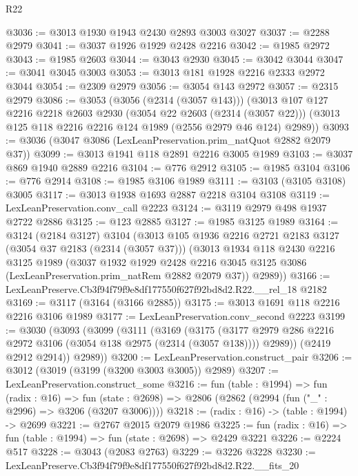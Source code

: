 \begin{lexlean}{R22}
\begin{coremodule}
@3036 := @3013 @1930 @1943 @2430 @2893 @3003 @3027
@3037 := @2288 @2979
@3041 := @3037 @1926 @1929 @2428 @2216
@3042 := @1985 @2972
@3043 := @1985 @2603
@3044 := @3043 @2930
@3045 := @3042 @3044
@3047 := @3041 @3045 @3003
@3053 := @3013 @181 @1928 @2216 @2333 @2972 @3044
@3054 := @2309 @2979
@3056 := @3054 @143 @2972
@3057 := @2315 @2979
@3086 := @3053
    (@3056 (@2314 (@3057 @143)))
    (@3013
      @107
      @127
      @2216
      @2218
      @2603
      @2930
      (@3054 @22 @2603 (@2314 (@3057 @22)))
      (@3013 @125 @118 @2216 @2216 @124 @1989 (@2556 @2979 @46 @124) @2989))
@3093 := @3036 (@3047 @3086 (LexLeanPreservation.prim_natQuot @2882 @2079 @37))
@3099 := @3013 @1941 @118 @2891 @2216 @3005 @1989
@3103 := @3037 @869 @1940 @2889 @2216
@3104 := @776 @2912
@3105 := @1985 @3104
@3106 := @776 @2914
@3108 := @1985 @3106 @1989
@3111 := @3103 (@3105 @3108) @3005
@3117 := @3013 @1938 @1693 @2887 @2218 @3104 @3108
@3119 := LexLeanPreservation.conv_call @2223
@3124 := @3119 @2979 @498 @1937 @2722 @2886
@3125 := @123 @2885
@3127 := @1985 @3125 @1989
@3164 := @3124
    (@2184 @3127)
    @3104
    (@3013
      @105
      @1936
      @2216
      @2721
      @2183
      @3127
      (@3054 @37 @2183 (@2314 (@3057 @37)))
      (@3013
        @1934
        @118
        @2430
        @2216
        @3125
        @1989
        (@3037
          @1932
          @1929
          @2428
          @2216
          @3045
          @3125
          @3086
          (LexLeanPreservation.prim_natRem @2882 @2079 @37))
        @2989))
@3166 := LexLeanPreserve.Cb3f94f79f9e8df177550f627f92bd8d2.R22.__rel_18 @2182
@3169 := @3117 (@3164 (@3166 @2885))
@3175 := @3013 @1691 @118 @2216 @2216 @3106 @1989
@3177 := LexLeanPreservation.conv_second @2223
@3199 := @3030
    (@3093
      (@3099
        (@3111
          (@3169
            (@3175
              (@3177 @2979 @286 @2216 @2972 @3106 (@3054 @138 @2975 (@2314 (@3057 @138))))
              @2989))
          (@2419 @2912 @2914))
        @2989))
@3200 := LexLeanPreservation.construct_pair
@3206 := @3012 (@3019 (@3199 (@3200 @3003 @3005)) @2989)
@3207 := LexLeanPreservation.construct_some
@3216 := fun (table : @1994) =>
  fun (radix : @16) =>
  fun (state : @2698) => @2806 (@2862 (@2994 (fun ("_" : @2996) => @3206 (@3207 @3006))))
@3218 := (radix : @16) -> (table : @1994) -> @2699
@3221 := @2767 @2015 @2079 @1986
@3225 := fun (radix : @16) => fun (table : @1994) => fun (state : @2698) => @2429 @3221
@3226 := @2224 @517
@3228 := @3043 (@2083 @2763)
@3229 := @3226 @3228
@3230 := LexLeanPreserve.Cb3f94f79f9e8df177550f627f92bd8d2.R22.__fits_20

\end{coremodule}
\end{lexlean}
